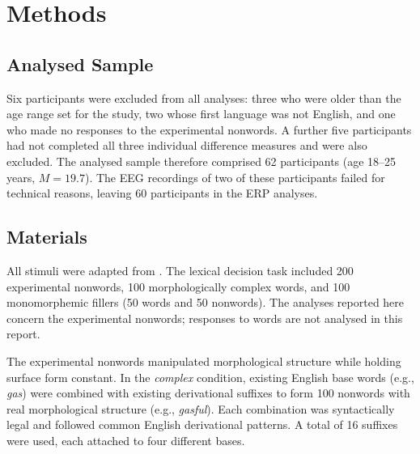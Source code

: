 
\section{Methods}


\subsection{Analysed Sample}

Six participants were excluded from all analyses: three who were older than the age range set for the study, two whose first language was not English, and one who made no responses to the experimental nonwords. A further five participants had not completed all three individual difference measures and were also excluded. The analysed sample therefore comprised 62 participants (age 18--25 years, $M = 19.7$). The EEG recordings of two of these participants failed for technical reasons, leaving 60 participants in the ERP analyses. %

\subsection{Materials}

All stimuli were adapted from \citet{sawiIndividualDifferencesSensitivity2016}. The lexical decision task included 200 experimental nonwords, 100 morphologically complex words, and 100 monomorphemic fillers (50 words and 50 nonwords). The analyses reported here concern the experimental nonwords; responses to words are not analysed in this report.

The experimental nonwords manipulated morphological structure while holding surface form constant. In the \textit{complex} condition, existing English base words (e.g., \textit{gas}) were combined with existing derivational suffixes to form 100 nonwords with real morphological structure (e.g., \textit{gasful}). Each combination was syntactically legal and followed common English derivational patterns. A total of 16 suffixes were used, each attached to four different bases. %

